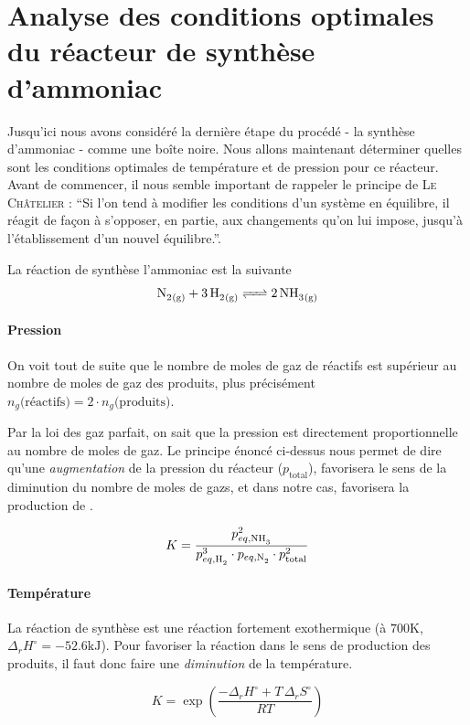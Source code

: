 

\section{Analyse des conditions optimales du réacteur de synthèse d'ammoniac}

Jusqu'ici nous avons considéré la dernière étape du procédé - la synthèse d'ammoniac -
comme une bo\^ite noire. Nous allons maintenant déterminer quelles sont les conditions 
optimales de température et de pression pour ce réacteur. 
Avant de commencer, il nous semble important de rappeler le principe 
de \textsc{Le Ch\^atelier} : \enquote{Si l'on tend à modifier les conditions d'un système en équilibre, 
il réagit de façon à s'opposer, en partie, aux changements qu'on lui impose, 
jusqu'à l'établissement d'un nouvel équilibre.}. \cite{chatelier}

La réaction de synthèse l'ammoniac est la suivante
\[\ce{N2_{(g)} + 3H2_{(g)} <=> 2NH3_{(g)} } \]

\paragraph{Pression}

On voit tout de suite que le nombre de moles de gaz de réactifs est supérieur 
au nombre de moles de gaz des produits, 
plus précisément $n_{g}\text{(réactifs)} = 2 \cdot n_{g}\text{(produits)}$.

Par la loi des gaz parfait, on sait que la pression est directement proportionnelle 
au nombre de moles de gaz. Le principe énoncé ci-dessus
nous permet de dire qu'une \emph{augmentation} de la pression du réacteur ($p_{\text{total}}$),
favorisera le sens de la diminution du nombre de moles de gazs, 
et dans notre cas, favorisera la production de .

\[
K = \frac{p_{eq,\ce{NH3}}^2}{p_{eq,\ce{H2}}^3 \cdot p_{eq,\ce{N2}} \cdot p_{\text{total}}^2}
\]
\paragraph{Température}

La réaction de synthèse est une réaction fortement exothermique 
(à $700\si{\kelvin}$, $\Delta_r H^{\circ} = -52.6\si{\kilo\joule}$).
Pour favoriser la réaction dans le sens de production des produits,
il faut donc faire une \emph{diminution} de la température.

\[
K = \exp{\left( \frac{- \Delta_r H^{\circ} + T \, \Delta_r S^{\circ}}{R T}\right)}
\]

